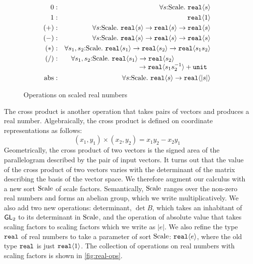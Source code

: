 \begin{figure}[t]
  \centering
  \begin{eqnarray*}
    0   &:& \forall s \mathord:\Scale.\ \tyPrim{real}{s} \\
    1   &:& \tyPrim{real}{1} \\
    (+) &:& \forall s \mathord:\Scale.\ \tyPrim{real}{s} \to \tyPrim{real}{s} \to \tyPrim{real}{s} \\
    (-) &:& \forall s \mathord:\Scale.\ \tyPrim{real}{s} \to \tyPrim{real}{s} \to \tyPrim{real}{s} \\
    (*) &:& \forall s_1,s_2 \mathord:\Scale.\ \tyPrim{real}{s_1} \to \tyPrim{real}{s_2} \to \tyPrim{real}{s_1s_2} \\
    (/) &:&
    \begin{array}[t]{@{}l}
      \forall s_1,s_2 \mathord:\Scale.\ \tyPrim{real}{s_1} \to \tyPrim{real}{s_2} \\
      \hspace{3.5cm}\to \tyPrim{real}{s_1s_2^{-1}} + \tyPrimNm{unit} \\
    \end{array}\\
    \mathrm{abs} &:& \forall s \mathord:\Scale.\ \tyPrim{real}{s} \to \tyPrim{real}{|s|} %
  \end{eqnarray*}
  \caption{Operations on scaled real numbers}
  \label{fig:real-ops}
\end{figure}

The cross product is another operation that takes pairs of vectors and
produces a real number. Algebraically, the cross product is defined on
coordinate representations as follows:
\begin{displaymath}
  (x_1,y_1) \times (x_2,y_2) = x_1y_2 - x_2y_1
\end{displaymath}
Geometrically, the cross product of two vectors is the signed area of
the parallelogram described by the pair of input vectors. It turns out
that the value of the cross product of two vectors varies with the
determinant of the matrix describing the basis of the vector space. We
therefore augment our calculus with a new sort $\mathrm{Scale}$ of scale
factors. Semantically, $\mathrm{Scale}$ ranges over the non-zero real numbers
and forms an abelian group, which we write multiplicatively. We also
add two new operations: determinant, $\det B$, which takes an
inhabitant of $\mathsf{GL}_2$ to its determinant in $\mathrm{Scale}$, and the
operation of absolute value that takes scaling factors to scaling
factors which we write as $|e|$. We also refine the type
$\texttt{real}$ of real numbers to take a parameter of sort
$\mathrm{Scale}$: $\texttt{real}\langle e \rangle$, where the old type $\texttt{real}$ is
just $\texttt{real}\langle 1 \rangle$. The collection of operations on real numbers
with scaling factors is shown in \autoref{fig:real-ops}.

